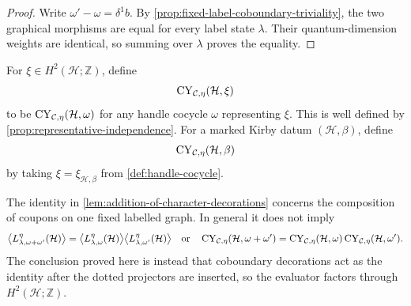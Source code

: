 \begin{proof}
Write \(\omega'-\omega=\delta^1b\).  By
\cref{prop:fixed-label-coboundary-triviality}, the two graphical morphisms
are equal for every label state \(\lambda\).  Their quantum-dimension weights
are identical, so summing over \(\lambda\) proves the equality.
\end{proof}

\begin{definition}
\label{def:cohomological-handle-evaluator}
For \(\xi\in H^2(\mathcal H;\mathbb Z)\), define
\[
  \operatorname{CY}_{\mathcal{C},\eta}(\mathcal H,\xi)
\]
to be \(\operatorname{CY}_{\mathcal{C},\eta}(\mathcal H,\omega)\) for any handle cocycle
\(\omega\) representing \(\xi\).  This is well defined by
\cref{prop:representative-independence}.  For a marked Kirby datum
\((\mathcal H,\beta)\), define
\[
  \operatorname{CY}_{\mathcal{C},\eta}(\mathcal H,\beta)
\]
by taking \(\xi=\xi_{\mathcal H,\beta}\) from
\cref{def:handle-cocycle}.
\end{definition}

\begin{remark}
\label{rem:decoration-not-evaluator-multiplicativity}
The identity in \cref{lem:addition-of-character-decorations} concerns the
composition of coupons on one fixed labelled graph.  In general it does not
imply
\[
  \bigl\langle L^\eta_{\lambda,\omega+\omega'}(\mathcal H)\bigr\rangle
  =
  \bigl\langle L^\eta_{\lambda,\omega}(\mathcal H)\bigr\rangle
  \bigl\langle L^\eta_{\lambda,\omega'}(\mathcal H)\bigr\rangle
  \quad\text{or}\quad
  \operatorname{CY}_{\mathcal{C},\eta}(\mathcal H,\omega+\omega')
  =\operatorname{CY}_{\mathcal{C},\eta}(\mathcal H,\omega)
   \operatorname{CY}_{\mathcal{C},\eta}(\mathcal H,\omega').
\]
The conclusion proved here is instead that coboundary decorations act as the
identity after the dotted projectors are inserted, so the evaluator factors
through \(H^2(\mathcal H;\mathbb Z)\).
\end{remark}
